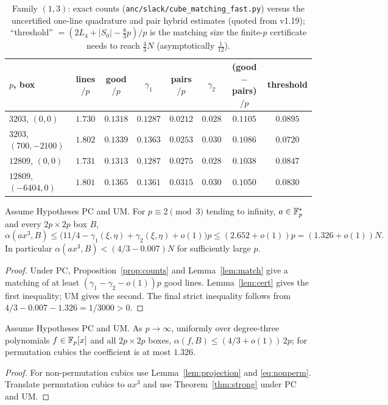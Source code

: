 \begin{table}[ht]\centering\scriptsize
\begin{tabular}{lccccccc}
\toprule
$p$, box & lines$/p$ & good$/p$ & $\gamma_1$ & pairs$/p$ & $\gamma_2$ & (good$-$pairs)$/p$ & threshold\\
\midrule
$3203$, $(0,0)$        & $1.730$ & $0.1318$ & $0.1287$ & $0.0212$ & $0.028$ & $0.1105$ & $0.0895$\\
$3203$, $(700,-2100)$  & $1.802$ & $0.1339$ & $0.1363$ & $0.0253$ & $0.030$ & $0.1086$ & $0.0720$\\
$12809$, $(0,0)$       & $1.731$ & $0.1313$ & $0.1287$ & $0.0275$ & $0.028$ & $0.1038$ & $0.0847$\\
$12809$, $(-6404,0)$   & $1.801$ & $0.1365$ & $0.1361$ & $0.0315$ & $0.030$ & $0.1050$ & $0.0830$\\
\bottomrule
\end{tabular}
\caption{Family $(1,3)$: exact counts (\texttt{anc/slack/cube\_matching\_fast.py}) versus the uncertified one-line quadrature and pair hybrid estimates (quoted from v1.19); ``threshold'' $=(2L_4+|S_0|-\tfrac83p)/p$ is
the matching size the finite-$p$ certificate needs to reach $\tfrac43N$ (asymptotically $\tfrac1{12}$).}\label{tab:strong}
\end{table}

\begin{theorem}\label{thm:strong}
Assume Hypotheses PC and UM.  For $p\equiv2\pmod3$ tending to infinity, $a\in\mathbb{F}_p^*$ and every $2p\times2p$ box $B$,
\[
 \alpha(ax^3,B)\le\bigl(11/4-\gamma_1(\xi,\eta)+\gamma_2(\xi,\eta)+o(1)\bigr)p
 \le(2.652+o(1))p=(1.326+o(1))N.
\]
In particular $\alpha(ax^3,B)<(4/3-0.007)N$ for sufficiently large $p$.
\end{theorem}
\begin{proof}
Under PC, Proposition~\ref{prop:counts} and Lemma~\ref{lem:match} give a matching of at least
$(\gamma_1-\gamma_2-o(1))p$ good lines.  Lemma~\ref{lem:cert} gives the first inequality; UM gives the second.
The final strict inequality follows from $4/3-0.007-1.326=1/3000>0$.
\end{proof}

\begin{corollary}\label{cor:g3}
Assume Hypotheses PC and UM.  As $p\to\infty$, uniformly over degree-three polynomials $f\in\mathbb{F}_p[x]$ and all $2p\times2p$ boxes,
$\alpha(f,B)\le(4/3+o(1))\,2p$; for permutation cubics the coefficient is at most $1.326$.
\end{corollary}
\begin{proof}
For non-permutation cubics use Lemma~\ref{lem:projection} and \eqref{eq:nonperm}.
Translate permutation cubics to $ax^3$ and use Theorem~\ref{thm:strong} under PC and UM.
\end{proof}

